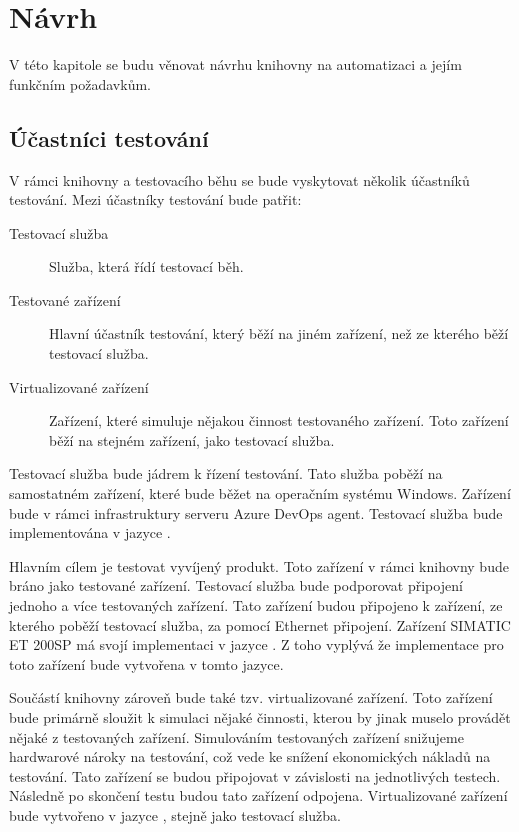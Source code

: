 \chapter{Návrh}

V této kapitole se budu věnovat návrhu knihovny na automatizaci a jejím funkčním požadavkům.

\section{Účastníci testování}
V rámci knihovny a testovacího běhu se bude vyskytovat několik účastníků testování. Mezi účastníky testování bude patřit:

\begin{description}
    \item[Testovací služba] Služba, která řídí testovací běh.
    \item[Testované zařízení] Hlavní účastník testování, který běží na jiném zařízení, než ze kterého běží testovací služba. 
    \item[Virtualizované zařízení] Zařízení, které simuluje nějakou činnost testovaného zařízení. Toto zařízení běží na stejném zařízení, jako testovací služba. 
\end{description}

Testovací služba bude jádrem k řízení testování. Tato služba poběží na samostatném zařízení, které bude běžet na operačním systému Windows. Zařízení bude v rámci infrastruktury serveru Azure DevOps agent. Testovací služba bude implementována v jazyce \csharp{}.

Hlavním cílem je testovat vyvíjený produkt. Toto zařízení v rámci knihovny bude bráno jako testované zařízení. Testovací služba bude podporovat připojení jednoho a více testovaných zařízení. Tato zařízení budou připojeno k zařízení, ze kterého poběží testovací služba, za pomocí Ethernet připojení. Zařízení SIMATIC ET 200SP má svojí implementaci v jazyce \cpp{}. Z toho vyplývá že implementace pro toto zařízení bude vytvořena v tomto jazyce. 

Součástí knihovny zároveň bude také tzv. virtualizované zařízení. Toto zařízení bude primárně sloužit k simulaci nějaké činnosti, kterou by jinak muselo provádět nějaké z testovaných zařízení. Simulováním testovaných zařízení snižujeme hardwarové nároky na testování, což vede ke snížení ekonomických nákladů na testování. Tato zařízení se budou připojovat v závislosti na jednotlivých testech. Následně po skončení testu budou tato zařízení odpojena. Virtualizované zařízení bude vytvořeno v jazyce \csharp{}, stejně jako testovací služba. 

